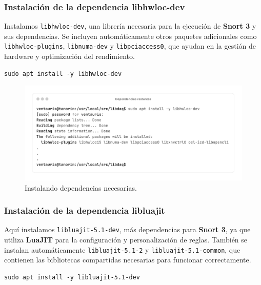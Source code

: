 \documentclass[11pt,a4paper,twoside]{report}
\begin{document}
\newpage

\subsubsection*{Instalación de la dependencia libhwloc-dev}

Instalamos \texttt{libhwloc-dev}, una librería necesaria para la ejecución de \textbf{Snort 3} y sus dependencias. Se incluyen automáticamente otros paquetes adicionales como \texttt{libhwloc-plugins}, \texttt{libnuma-dev} y \texttt{libpciaccess0}, que ayudan en la gestión de hardware y optimización del rendimiento.

\begin{lstlisting}[style=commandstyle, caption={Instalando libhwloc-dev y dependencias relacionadas}]
	sudo apt install -y libhwloc-dev
\end{lstlisting}

\begin{figure}[H]
	\centering
	\includegraphics[scale=0.12]{instalacion_snort/15-15.png}
	\caption{Instalando dependencias necesarias.}
\end{figure}

\subsubsection*{Instalación de la dependencia libluajit}

Aquí instalamos \texttt{libluajit-5.1-dev}, más dependencias para \textbf{Snort 3}, ya que utiliza \textbf{LuaJIT} para la configuración y personalización de reglas. También se instalan automáticamente \texttt{libluajit-5.1-2} y \texttt{libluajit-5.1-common}, que contienen las bibliotecas compartidas necesarias para funcionar correctamente.

\begin{lstlisting}[style=commandstyle, caption={Instalando LuaJIT para Snort}]
	sudo apt install -y libluajit-5.1-dev
\end{lstlisting}
\end{document}
